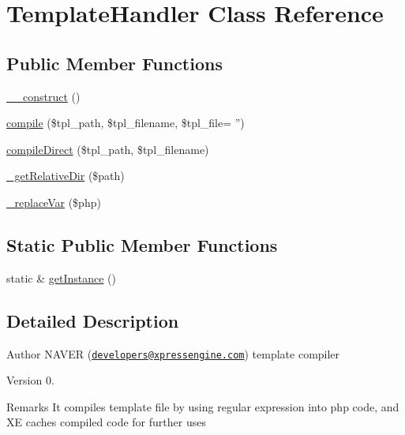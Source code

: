 \hypertarget{classTemplateHandler}{\section{Template\+Handler Class Reference}
\label{classTemplateHandler}
}
\subsection*{Public Member Functions}
\begin{DoxyCompactItemize}
\item 
\hyperlink{classTemplateHandler_ab113c65769e65c4fe531c4cf41655f1d}{\+\_\+\+\_\+construct} ()
\item 
\hyperlink{classTemplateHandler_ae2e69591d815bb49316bb85adbaff581}{compile} (\$tpl\+\_\+path, \$tpl\+\_\+filename, \$tpl\+\_\+file= '')
\item 
\hyperlink{classTemplateHandler_a1fe9c84873c23970ea7779be59dcb2d5}{compile\+Direct} (\$tpl\+\_\+path, \$tpl\+\_\+filename)
\item 
\hyperlink{classTemplateHandler_a6d8e3da7128be8bded89dc9edc4a1bc8}{\+\_\+get\+Relative\+Dir} (\$path)
\item 
\hyperlink{classTemplateHandler_a10cb255c35e1e617f182e349b80cc335}{\+\_\+replace\+Var} (\$php)
\end{DoxyCompactItemize}
\subsection*{Static Public Member Functions}
\begin{DoxyCompactItemize}
\item 
static \& \hyperlink{classTemplateHandler_a9745460c5daccfc48abf8652778b2718}{get\+Instance} ()
\end{DoxyCompactItemize}


\subsection{Detailed Description}
\begin{DoxyAuthor}{Author}
N\+A\+V\+E\+R (\href{mailto:developers@xpressengine.com}{\tt developers@xpressengine.\+com}) template compiler 
\end{DoxyAuthor}
\begin{DoxyVersion}{Version}
0. 
\end{DoxyVersion}
\begin{DoxyRemark}{Remarks}
It compiles template file by using regular expression into php code, and X\+E caches compiled code for further uses 
\end{DoxyRemark}


